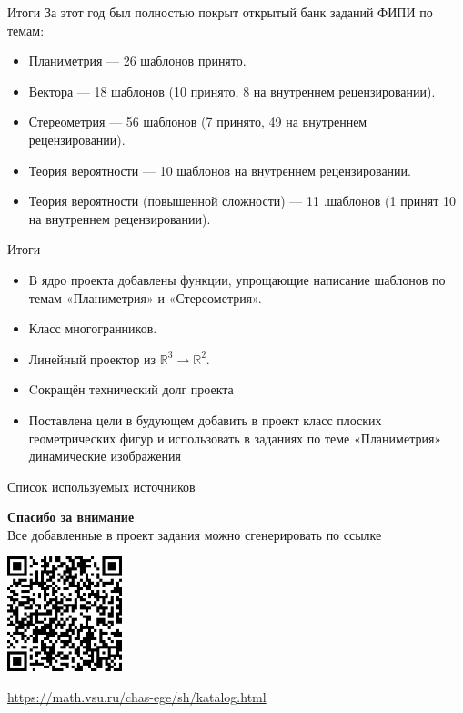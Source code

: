 \documentclass[aspectratio=169,12pt]{beamer}
\begin{document}
\begin{frame}{Итоги}
	За этот год был полностью покрыт открытый банк заданий ФИПИ по темам:
	\begin{itemize}
		\item Планиметрия — 26 шаблонов принято.
		\item Вектора — 18 шаблонов (10 принято, 8 на внутреннем рецензировании).
		\item Стереометрия — 56 шаблонов (7 принято, 49 на внутреннем рецензировании).
		\item Теория вероятности — 10 шаблонов на внутреннем рецензировании.
		\item Теория вероятности (повышенной сложности) — 11 .шаблонов (1 принят 10 на внутреннем рецензировании).
	\end{itemize}

\end{frame}

\begin{frame}{Итоги}
	
	\begin{itemize}
		\item В ядро проекта добавлены функции, упрощающие написание шаблонов по темам «Планиметрия» и  «Стереометрия».
		\item Класс многогранников.
		\item Линейный проектор из $\mathbb{R}^3 \to \mathbb{R}^2$.
	\end{itemize}

	\begin{itemize}
		\item Cокращён технический долг проекта
		\item Поставлена цели в будующем добавить в проект класс плоских геометрических фигур и использовать в заданиях по теме «Планиметрия» динамические изображения
	\end{itemize}
\end{frame}

\begin{frame}{Список используемых источников}
	
\end{frame}

\begin{frame}
	\center\large\textcolor{NordBrightBlue}{\textbf{Спасибо за внимание}}\\
	\hfill \break
	\normalsize
	Все добавленные в проект задания можно сгенерировать по ссылке\\
	\hfill \break

	\includegraphics[width=0.25\textwidth]{QR-code}\\
	\hfill \break

	\url{https://math.vsu.ru/chas-ege/sh/katalog.html}
\end{frame}
\end{document}
